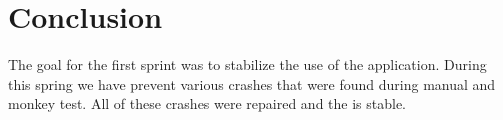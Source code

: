 
\chapter{Conclusion}
\label{cha:conclusion}

The goal for the first sprint was to stabilize the use of the \launcher application. During this spring we have prevent various crashes that were found during manual and monkey test. All of these crashes were repaired and the \launcher is stable.


